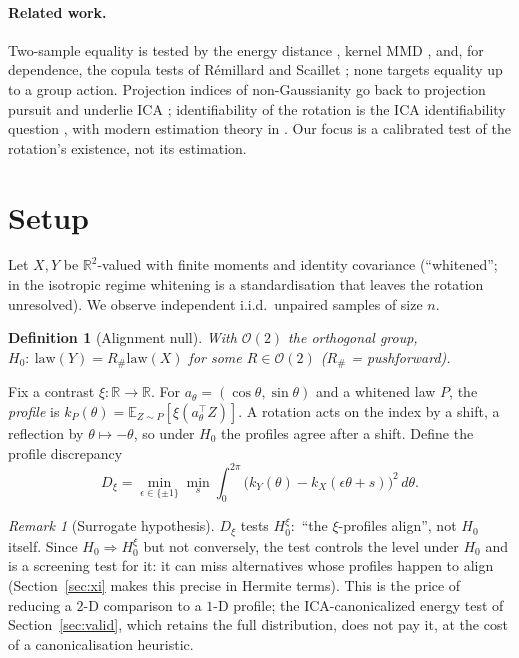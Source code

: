 \documentclass[]{interact}
\theoremstyle{plain}
\newtheorem{definition}{Definition}
\theoremstyle{remark}
\newtheorem{remark}{Remark}
\newcommand{\R}{\mathbb{R}}
\newcommand{\E}{\mathbb{E}}
\newcommand{\law}{\mathrm{law}}
\newcommand{\Ocal}{\mathcal{O}}
\newcommand{\push}[1]{{#1}_{\#}}
\begin{document}
\paragraph{Related work.} Two-sample equality is tested by the energy distance
\cite{szekely}, kernel MMD \cite{gretton}, and, for dependence, the copula tests of
R\'emillard and Scaillet \cite{remillard}; none targets equality up to a group
action. Projection indices of non-Gaussianity go back to projection pursuit
\cite{friedman,huber} and underlie ICA \cite{comon,hyvarinen}; identifiability of
the rotation is the ICA identifiability question \cite{comon}, with modern
estimation theory in \cite{chenbickel,samworth}. Our focus is a calibrated test of
the rotation's existence, not its estimation.

\section{Setup}
\label{sec:setup}

Let $X,Y$ be $\R^2$-valued with finite moments and identity covariance
(``whitened''; in the isotropic regime whitening is a standardisation that leaves
the rotation unresolved). We observe independent i.i.d.\ unpaired samples of size
$n$.

\begin{definition}[Alignment null]
With $\Ocal(2)$ the orthogonal group, $H_0:\ \law(Y)=\push{R}\law(X)$ for some
$R\in\Ocal(2)$ ($\push{R}$ = pushforward).
\end{definition}

Fix a contrast $\xi:\R\to\R$. For $a_\theta=(\cos\theta,\sin\theta)$ and a whitened
law $P$, the \emph{profile} is $k_P(\theta)=\E_{Z\sim P}[\xi(a_\theta^\top Z)]$. A
rotation acts on the index by a shift, a reflection by $\theta\mapsto-\theta$, so
under $H_0$ the profiles agree after a shift. Define the profile discrepancy
\[
D_\xi=\min_{\epsilon\in\{\pm1\}}\min_s\int_0^{2\pi}\big(k_Y(\theta)-
k_X(\epsilon\theta+s)\big)^2\,d\theta .
\]

\begin{remark}[Surrogate hypothesis]
\label{rem:surrogate}
$D_\xi$ tests $H_0^\xi:$ ``the $\xi$-profiles align'', not $H_0$ itself. Since
$H_0\Rightarrow H_0^\xi$ but not conversely, the test controls the level under
$H_0$ and is a screening test for it: it can miss alternatives whose profiles
happen to align (Section~\ref{sec:xi} makes this precise in Hermite terms). This is
the price of reducing a $2$-D comparison to a $1$-D profile; the ICA-canonicalized
energy test of Section~\ref{sec:valid}, which retains the full distribution, does
not pay it, at the cost of a canonicalisation heuristic.
\end{remark}
\end{document}
